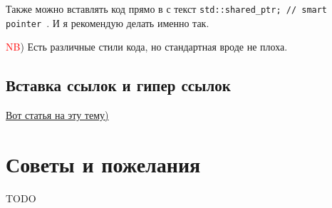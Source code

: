 \documentclass[12pt]{article}
\begin{document}
Также можно вставлять код прямо в с текст \texttt{std::shared_ptr; // smart pointer }. И я рекомендую делать именно так.


\textcolor{red}{NB}) Есть различные стили кода, но стандартная вроде не плоха.

\subsection{Вставка ссылок и гипер ссылок}

\href{http://blog.harrix.org/article/661#h2_2}{Вот статья на эту тему)}

\section{Советы и пожелания}
 TODO
\end{document}

